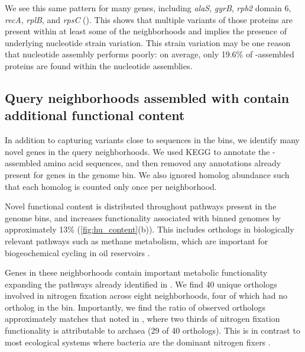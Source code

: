 We see this same pattern for many genes, including {\em alaS}, {\em gyrB},
{\em rpb2}
domain 6, {\em recA}, {\em rplB}, and {\em rpsC} ().
This shows that multiple variants of those proteins are present within
at least some of the neighborhoods and implies the presence of
underlying nucleotide strain variation.
This strain variation may be
one reason that nucleotide assembly performs poorly: on average, only
19.6\% of \plass-assembled proteins are found within the nucleotide
assemblies.

\subsection*{Query neighborhoods assembled with \plass contain additional functional content}

In addition to capturing variants close to sequences in the bins, we
identify many novel genes in the query neighborhoods. We used KEGG to
annotate the \plass-assembled amino acid sequences, and then removed
any annotations already present for genes in the genome bin.  We also
ignored homolog abundance such that each homolog is counted only once
per neighborhood.

Novel functional content is distributed throughout pathways present in
the genome bins, and increases functionality associated with binned
genomes by approximately 13\% (\autoref{fig:hu_content}(b)).  This
includes orthologs in biologically relevant pathways
such as methane metabolism, which are important for biogeochemical
cycling in oil reservoirs \cite{Hu2016}.

Genes in these neighborhoods contain important metabolic functionality expanding
the pathways already identified in \cite{Hu2016}. We find 40
unique orthologs involved in nitrogen fixation across eight
neighborhoods, four of which had no ortholog in the bin.  Importantly,
we find the ratio of observed orthologs approximately matches that
noted in \cite{Hu2016}, where two thirds of nitrogen fixation
functionality is attributable to archaea (29 of 40 orthologs). This is
in contrast to most ecological systems where bacteria are the dominant
nitrogen fixers \cite{Hu2016}.
